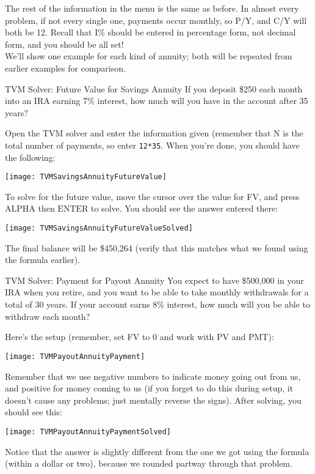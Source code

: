 The rest of the information in the menu is the same as before.  In almost every problem, if not every single one, payments occur monthly, so P/Y, and C/Y will both be 12.  Recall that I\% should be entered in percentage form, not decimal form, and you should be all set!\\

We'll show one example for each kind of annuity; both will be repeated from earlier examples for comparison.

\begin{example}{TVM Solver: Future Value for Savings Annuity}
If you deposit \$250 each month into an IRA earning 7\% interest, how much will you have in the account after 35 years?

\sol
Open the TVM solver and enter the information given (remember that N is the total number of payments, so enter \texttt{12*35}.  When you're done, you should have the following:
\begin{center}
\texttt{[image: TVMSavingsAnnuityFutureValue]}
\end{center}
To solve for the future value, move the cursor over the value for FV, and press $\boxed{\textrm{ALPHA}}$ then $\boxed{\textrm{ENTER}}$ to solve.  You should see the answer entered there:
\begin{center}
\texttt{[image: TVMSavingsAnnuityFutureValueSolved]}
\end{center}
The final balance will be \$450,264 (verify that this matches what we found using the formula earlier).
\end{example}

\begin{example}{TVM Solver: Payment for Payout Annuity}
You expect to have \$500,000 in your IRA when you retire, and you want to be able to take monthly withdrawals for a total of 30 years.  If your account earns 8\% interest, how much will you be able to withdraw each month?

\sol
Here's the setup (remember, set FV to 0 and work with PV and PMT):
\begin{center}
\texttt{[image: TVMPayoutAnnuityPayment]}
\end{center}
Remember that we use negative numbers to indicate money going out from us, and positive for money coming to us (if you forget to do this during setup, it doesn't cause any problems; just mentally reverse the signs).  After solving, you should see this:
\begin{center}
\texttt{[image: TVMPayoutAnnuityPaymentSolved]}
\end{center}
Notice that the answer is slightly different from the one we got using the formula (within a dollar or two), because we rounded partway through that problem.
\end{example}

